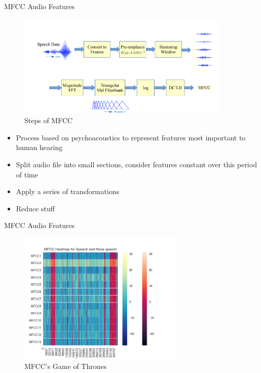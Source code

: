 \documentclass[notes]{beamer}
\begin{document}
\begin{frame}{MFCC Audio Features}
\begin{minipage}{0.45\textwidth}
	\centering
	\begin{figure}
		\includegraphics[width=0.9\textwidth]{figures/MFCC_process}
		\caption{Steps of MFCC\cite{mfcc_steps}}
	\end{figure}
	
\end{minipage}\hfill
\begin{minipage}{0.45\textwidth}
\begin{itemize}
	\item Process based on psychoacoustics to represent features most important to human hearing
	\item Split audio file into small sections, consider features constant over this period of time
	\item Apply a series of transformations
	\item Reduce stuff
\end{itemize}
\end{minipage}\hfill
\end{frame}


\begin{frame}{MFCC Audio Features}

	\centering
	\begin{figure}
		\includegraphics[width=0.7\textwidth]{figures/mfcc_heatmap_speech_or_nospeech}
		\caption{MFCC's Game of Thrones}
	\end{figure}

\end{frame}
\end{document}
